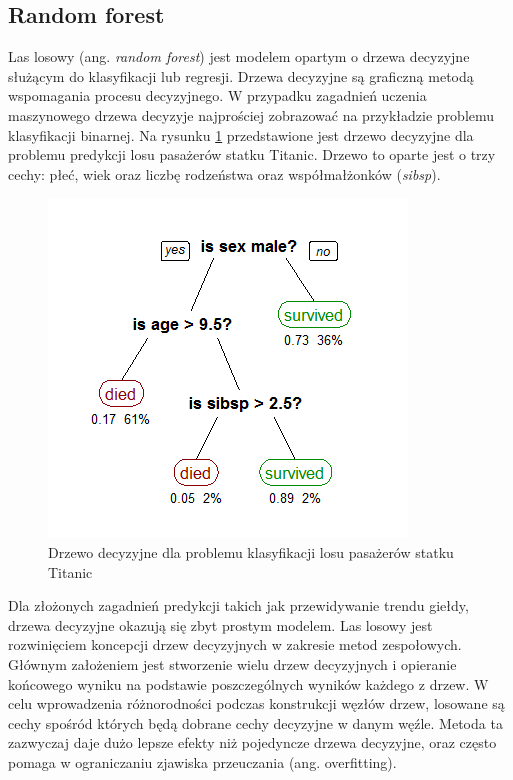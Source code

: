 \documentclass[a4paper, twoside, 11pt, openright]{article}
\begin{document}
\subsection{Random forest \cite{randforest}}

Las losowy (ang. \textit{random forest}) jest modelem opartym o drzewa decyzyjne służącym do klasyfikacji lub regresji. Drzewa decyzyjne są graficzną metodą wspomagania procesu decyzyjnego. W przypadku zagadnień uczenia maszynowego drzewa decyzyje najprościej zobrazować na przykładzie problemu klasyfikacji binarnej. Na rysunku \ref{img:wiki_dec_tree} przedstawione jest drzewo decyzyjne dla problemu predykcji losu pasażerów statku Titanic. Drzewo to oparte jest o trzy cechy: płeć, wiek oraz liczbę rodzeństwa oraz współmałżonków (\textit{sibsp}). 

\begin{figure}[H]
\centering \includegraphics[scale=0.6]{img/decision_tree.png}
\caption{Drzewo decyzyjne dla problemu klasyfikacji losu pasażerów statku Titanic \cite{wikidecisiontree}}
\label{img:wiki_dec_tree}
\end{figure}

Dla złożonych zagadnień predykcji takich jak przewidywanie trendu giełdy, drzewa decyzyjne okazują się zbyt prostym modelem. Las losowy jest rozwinięciem koncepcji drzew decyzyjnych w zakresie metod zespołowych. Głównym założeniem jest stworzenie wielu drzew decyzyjnych i opieranie końcowego wyniku na podstawie poszczególnych wyników każdego z drzew. W celu wprowadzenia różnorodności podczas konstrukcji węzłów drzew, losowane są cechy spośród których będą dobrane cechy decyzyjne w danym węźle. Metoda ta zazwyczaj daje dużo lepsze efekty niż pojedyncze drzewa decyzyjne, oraz często pomaga w ograniczaniu zjawiska przeuczania (ang. overfitting).  
\end{document}
